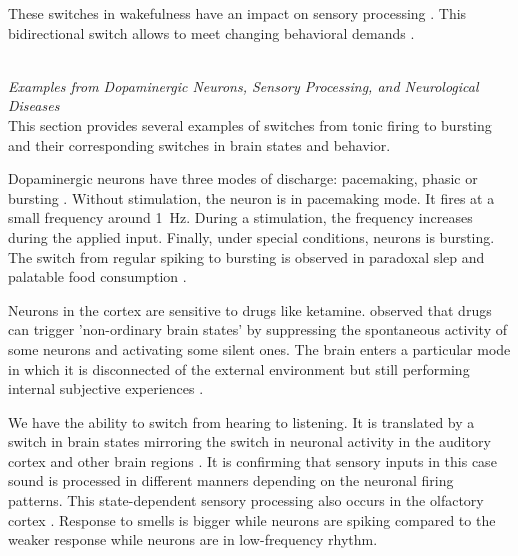 These switches in wakefulness have an impact on sensory processing \citep{steriade_natural_2001}. This bidirectional switch allows to meet changing behavioral demands \citep{crandall_corticothalamic_2015}. 

~\\
\textit{Examples from Dopaminergic Neurons, Sensory Processing, and Neurological Diseases}\\
This section provides several examples of switches from tonic firing to bursting and their corresponding switches in brain states and behavior. 

Dopaminergic neurons have three modes of discharge: pacemaking, phasic or bursting \citep{tsai_phasic_2009, johnson_burst_1992}. Without stimulation, the neuron is in pacemaking mode. It fires at a small frequency around \SI{1}{Hz}. During a stimulation, the frequency increases during the applied input. Finally, under special conditions, neurons is bursting. The switch from regular spiking to bursting is observed in paradoxal slep and palatable food consumption \citep{dahan_prominent_2007, ji_tuning_2009}. 

Neurons in the cortex are sensitive to drugs like ketamine. \citep{cichon_ketamine_2023} observed that drugs can trigger 'non-ordinary brain states' by suppressing the spontaneous activity of some neurons and activating some silent ones. The brain enters a particular mode in which it is disconnected of the external environment but still performing internal subjective experiences \citep{cichon_ketamine_2023, yang_ketamine_2018}. 

We have the ability to switch from hearing to listening. It is translated by a switch in brain states mirroring the switch in neuronal activity in the auditory cortex and other brain regions \citep{de_franceschi_task-induced_2021}. It is confirming that sensory inputs in this case sound is processed in different manners depending on the neuronal firing patterns. This state-dependent sensory processing also occurs in the olfactory cortex \citep{murakami_state-dependent_2005}. Response to smells is bigger while neurons are spiking compared to the weaker response while neurons are in low-frequency rhythm. 


